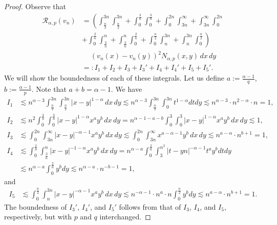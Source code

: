 \documentclass[12pt, a4paper]{amsart}
\newcommand{\RR}{\mathcal{R}}
\begin{document}
\begin{proof} Observe that
    \begin{align*}
        \RR_{\alpha, p}(v_n) &= \left(
         \int_{\frac{n}{2}}^{3n}\int_{\frac{n}{2}}^{3n}
         +\int_{0}^{\frac{3}{n}}\int_{0}^{\frac{3}{n}}
         +\int_{0}^{2n}\int_{3n}^{\infty} + \int_{3n}^{\infty}\int_{0}^{2n} \right.
         \\
         &+ \left. \int_{0}^{\frac{2}{n}}\int_{\frac{3}{n}}^{n} + \int_{\frac{3}{n}}^{n}\int_{0}^{\frac{2}{n}}
         +\int_{0}^{\frac{n}{2}}\int_{n}^{3n} + \int_{n}^{3n}\int_{0}^{\frac{n}{2}}
         \right) 
         \\
        & \quad \ \left(v_n(x)-v_n(y)\right)^{2}N_{\alpha, p}(x, y)\,dx\,dy
        \\
        &=: I_1 + I_2 + I_3 + I_3' + I_4 + I_4' + I_5 + I_5'.
    \end{align*}
We will show the boundedness of each of these integrals. Let us define $a := \frac{\alpha-1}{q}$, $b := \frac{\alpha-1}{p}$. Note that $a + b = \alpha - 1$. We have
\begin{align*}
    I_1 &\lesssim n^{\alpha - 3}\int_{\frac{n}{2}}^{3n}\int_{\frac{n}{2}}^{3n}|x - y|^{1-\alpha}\,dx\,dy \lesssim n^{\alpha - 3}\int_{\frac{n}{2}}^{3n}\int_{0}^{3n}t^{1-\alpha}dtdy \lesssim n^{\alpha - 3} \cdot n^{2-\alpha} \cdot n = 1,
    \\
    I_2 &\lesssim n^2 \int_{0}^{\frac{3}{n}}\int_{0}^{\frac{3}{n}}|x - y|^{1-\alpha}x^{a}y^{b}\,dx\,dy 
    = 
    n^{\alpha-1-a-b}\int_0^3\int_0^3|x-y|^{1-\alpha}x^ay^b\,dx\,dy
    \lesssim 1,
    \\
    I_3 &\lesssim \int_{0}^{2n}\int_{3n}^{\infty}|x - y|^{-\alpha -1}x^a y^b \,dx\,dy \lesssim \int_{0}^{2n}\int_{3n}^{\infty}x^{a-\alpha-1}y^b\,dx\,dy \lesssim n^{a-\alpha} \cdot n^{b+1} = 1,
    \\
    I_4 &\lesssim \int_{0}^{\frac{2}{n}}\int_{\frac{3}{n}}^{n}|x - y|^{-1 - \alpha}x^a y^b \,dx\,dy = n^{\alpha - a}\int_{0}^{\frac{2}{n}}\int_{3}^{n^2}|t-yn|^{-\alpha -1}t^a y^b dtdy 
    \\
    &\lesssim n^{\alpha-a} \int_{0}^{\frac{2}{n}}y^bdy \lesssim n^{\alpha - a} \cdot n^{-b - 1} = 1,
\end{align*}
and
\begin{align*}
    I_5 &\lesssim \int_{0}^{\frac{n}{2}}\int_{n}^{3n}|x - y|^{-\alpha -1}x^a y^b \,dx\,dy \lesssim n^{-\alpha -1} \cdot n^{a} \cdot n \int_0^\frac{n}{2}y^bdy \lesssim n^{a-\alpha} \cdot n^{b+1} = 1.
\end{align*}
The boundedness of $I_3'$, $I_4'$, and $I_5'$ follows from that of $I_3$, $I_4$, and $I_5$, respectively, but with $p$ and $q$ interchanged.
\end{proof}
\end{document}
